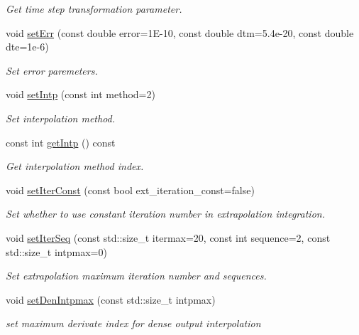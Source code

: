 \begin{DoxyCompactItemize}
\begin{DoxyCompactList}\small\item\em Get time step transformation parameter. \end{DoxyCompactList}\item 
void \hyperlink{classARC_1_1chainpars_a59709cc9464bed3a17f99cf3fd611ad3}{set\+Err} (const double error=1\+E-\/10, const double dtm=5.\+4e-\/20, const double dte=1e-\/6)
\begin{DoxyCompactList}\small\item\em Set error paremeters. \end{DoxyCompactList}\item 
void \hyperlink{classARC_1_1chainpars_ae5946e3523a7e72d38f579e900dd20e5}{set\+Intp} (const int method=2)
\begin{DoxyCompactList}\small\item\em Set interpolation method. \end{DoxyCompactList}\item 
const int \hyperlink{classARC_1_1chainpars_a090e8199e8081235539b2ffd71cf60ef}{get\+Intp} () const 
\begin{DoxyCompactList}\small\item\em Get interpolation method index. \end{DoxyCompactList}\item 
void \hyperlink{classARC_1_1chainpars_acee4adb70778441325e76eedbdbe6343}{set\+Iter\+Const} (const bool ext\+\_\+iteration\+\_\+const=false)
\begin{DoxyCompactList}\small\item\em Set whether to use constant iteration number in extrapolation integration. \end{DoxyCompactList}\item 
void \hyperlink{classARC_1_1chainpars_a4b9a1b853f414f1dfb4ca1fc36d2178b}{set\+Iter\+Seq} (const std\+::size\+\_\+t itermax=20, const int sequence=2, const std\+::size\+\_\+t intpmax=0)
\begin{DoxyCompactList}\small\item\em Set extrapolation maximum iteration number and sequences. \end{DoxyCompactList}\item 
void \hyperlink{classARC_1_1chainpars_aa19305c22ed42da4256e968ba38df871}{set\+Den\+Intpmax} (const std\+::size\+\_\+t intpmax)
\begin{DoxyCompactList}\small\item\em set maximum derivate index for dense output interpolation \end{DoxyCompactList}\item 

\end{DoxyCompactItemize}

